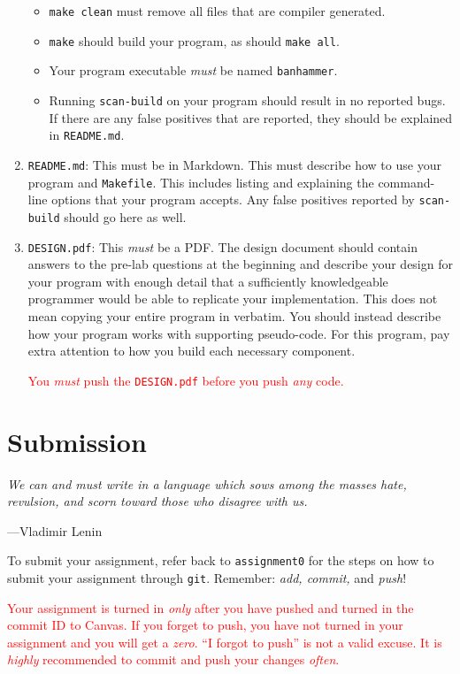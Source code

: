 \documentclass{article}
\begin{document}
\begin{enumerate}
\begin{itemize}
      \item \texttt{make clean} must remove all files that are compiler
        generated.
      \item \texttt{make} should build your program, as should
        \texttt{make all}.
      \item Your program executable \emph{must} be named
        \texttt{banhammer}.
      \item Running \texttt{scan-build} on your program should result in
        no reported bugs. If there are any false positives that are
        reported, they should be explained in \texttt{README.md}.
  \end{itemize}

  \item \texttt{README.md}: This must be in Markdown. This must describe
    how to use your program and \texttt{Makefile}. This includes listing
    and explaining the command-line options that your program accepts.
    Any false positives reported by \texttt{scan-build} should go here
    as well.

  \item \texttt{DESIGN.pdf}: This \emph{must} be a PDF. The design
    document should contain answers to the pre-lab questions at the
    beginning and describe your design for your program with enough
    detail that a sufficiently knowledgeable programmer would be able to
    replicate your implementation.  This does not mean copying your
    entire program in verbatim. You should instead describe how your
    program works with supporting pseudo-code. For this program, pay
    extra attention to how you build each necessary component.

  \textcolor{red}{You \emph{must} push the \texttt{DESIGN.pdf} before
  you push \emph{any} code.}
\end{enumerate}


\section{Submission}

\epigraph{\emph{We can and must write in a language which sows among the
masses hate, revulsion, and scorn toward those who disagree with
us.}}{---Vladimir Lenin}

\noindent To submit your assignment, refer back to \texttt{assignment0}
for the steps on how to submit your assignment through \texttt{git}.
Remember: \emph{add, commit,} and \emph{push}!

\textcolor{red}{Your assignment is turned in \emph{only} after you have
  pushed and turned in the commit ID to Canvas. If you forget to push,
  you have not turned in your assignment and you will get a \emph{zero}.
  ``I forgot to push'' is not a valid excuse. It is \emph{highly}
  recommended to commit and push your changes \emph{often}.}
\end{document}
